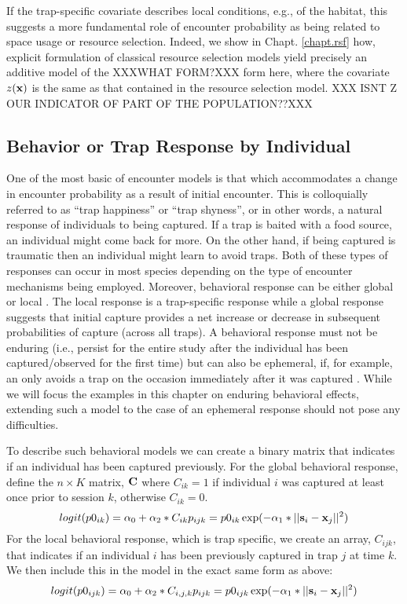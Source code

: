 If the trap-specific covariate describes local conditions, e.g., of
the habitat, this suggests a more fundamental role of encounter
probability as being related to space usage or resource
selection. Indeed, we show in Chapt. \ref{chapt.rsf} how, explicit
formulation of classical resource selection models yield precisely an
additive model of the XXXWHAT FORM?XXX form here, where the covariate
$z({\bf x})$ is the same as that contained in the resource selection
model. XXX ISNT Z OUR INDICATOR OF PART OF THE POPULATION??XXX



\subsection{Behavior or Trap Response by Individual}

One of the most basic of encounter models is that which accommodates a
change in encounter probability as a result of initial encounter.
This is colloquially referred to as ``trap happiness'' or ``trap shyness'', or in other words, a
natural response of individuals to being captured. If a trap is baited
with a food source, an individual might come back for
more. On the other hand, if being captured is traumatic then an
individual might learn to avoid traps. Both of these types of
responses can occur in most species depending on the type of encounter
mechanisms being employed. Moreover, behavioral response can be either
global \citep{gardner_etal:2010} or local \citep{royle_etal:2009jwm}.
The local response is a trap-specific response 
while a global response suggests that
initial capture provides a net increase or decrease in subsequent probabilities of capture (across all
traps). A behavioral response must not be enduring (i.e., persist for the entire study after the individual has been captured/observed for the first time) but can also be ephemeral, if, for example, an only avoids a trap on the occasion immediately after it was captured \citep{royle:2008B, yang_chao:2005}. While we will focus the examples in this chapter on enduring behavioral effects, extending such a model to the case of an ephemeral response should not pose any difficulties. 

To describe such behavioral models we can create a binary matrix that indicates
if an individual has been captured previously.  For the global
behavioral response, define the $n \times K$ matrix,
${\bf C}$ where $C_{ik} =1$
if individual $i$ was captured at least once prior to session
$k$, otherwise $C_{ik} = 0$.
\[
logit(p0_{ik}) = \alpha_{0} + \alpha_2*C_{ik}
p_{ijk} = p0_{ik} \exp(- \alpha_1*||{\bf s}_{i}-{\bf x}_{j}||^2)
\]
For the local behavioral response, which is trap specific, we create
an array, $C_{ijk}$, that indicates if an individual $i$ has been
previously captured in trap $j$ at time $k$.  We then include this in
the model in the exact same form as above:
\[
logit(p0_{ijk}) = \alpha_{0} + \alpha_2*C_{i,j,k}
p_{ijk} = p0_{ijk} \exp(- \alpha_1*||{\bf s}_{i}-{\bf x}_{j}||^2)
\]




